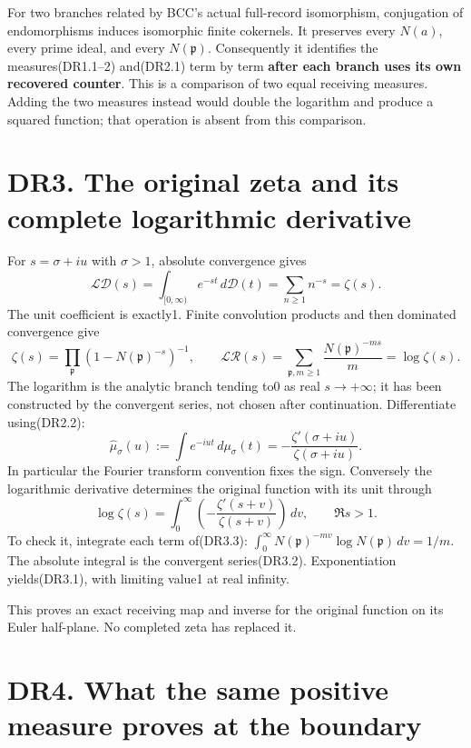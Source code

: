 \documentclass[
]{report}
\begin{document}
For two branches related by BCC's actual full-record isomorphism,
conjugation of endomorphisms induces isomorphic finite cokernels. It
preserves every \(N(a)\), every prime ideal, and every
\(N(\mathfrak p)\). Consequently it identifies the measures(DR1.1--2)
and(DR2.1) term by term \textbf{after each branch uses its own recovered
counter}. This is a comparison of two equal receiving measures. Adding
the two measures instead would double the logarithm and produce a
squared function; that operation is absent from this comparison.

\section{DR3. The original zeta and its complete logarithmic
derivative}\label{dr3.-the-original-zeta-and-its-complete-logarithmic-derivative}

For \(s=\sigma+iu\) with \(\sigma>1\), absolute convergence gives \[
\mathcal L\mathcal D(s)
=\int_{[0,\infty)}e^{-st}\,d\mathcal D(t)
=\sum_{n\ge1}n^{-s}=\zeta(s).
\tag{DR3.1}
\] The unit coefficient is exactly1. Finite convolution products and
then dominated convergence give \[
\zeta(s)=\prod_{\mathfrak p}(1-N(\mathfrak p)^{-s})^{-1},
\qquad
\mathcal L\mathcal R(s)=\sum_{\mathfrak p,m\ge1}
\frac{N(\mathfrak p)^{-ms}}m=\log\zeta(s).
\tag{DR3.2}
\] The logarithm is the analytic branch tending to0 as real
\(s\to+\infty\); it has been constructed by the convergent series, not
chosen after continuation. Differentiate using(DR2.2): \[
\boxed{\widehat\mu_\sigma(u)
:=\int e^{-iut}\,d\mu_\sigma(t)
=-\frac{\zeta'(\sigma+iu)}{\zeta(\sigma+iu)}.}
\tag{DR3.3}
\] In particular the Fourier transform convention fixes the sign.
Conversely the logarithmic derivative determines the original function
with its unit through \[
\log\zeta(s)=\int_0^\infty
\left(-\frac{\zeta'(s+v)}{\zeta(s+v)}\right)\,dv,
\qquad \Re s>1.
\tag{DR3.4}
\] To check it, integrate each term of(DR3.3):
\(\int_0^\infty N(\mathfrak p)^{-mv}\log N(\mathfrak p)\,dv=1/m\). The
absolute integral is the convergent series(DR3.2). Exponentiation
yields(DR3.1), with limiting value1 at real infinity.

This proves an exact receiving map and inverse for the original function
on its Euler half-plane. No completed zeta has replaced it.

\section{DR4. What the same positive measure proves at the
boundary}\label{dr4.-what-the-same-positive-measure-proves-at-the-boundary}
\end{document}
